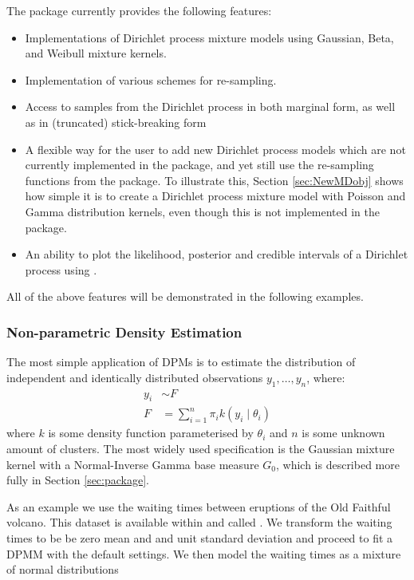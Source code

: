 \documentclass[nojss]{jss}
\begin{document}
The  package currently provides the following features:

\begin{itemize}
\item Implementations of Dirichlet process mixture models using Gaussian, Beta, and Weibull mixture kernels.
\item Implementation of various schemes for re-sampling.
\item Access to samples from the Dirichlet process in both marginal form, as well as in (truncated) stick-breaking form
\item A flexible way for the user to add new Dirichlet process models which are not currently implemented in the package, and yet still use the re-sampling functions from the package. To illustrate this, Section \ref{sec:NewMDobj} shows how simple it is to create a Dirichlet process mixture model with Poisson and Gamma distribution kernels, even though this is not implemented in the package.
\item An ability to plot the likelihood, posterior and credible intervals of a Dirichlet process using .
\end{itemize}

All of the above features will be demonstrated in the following examples.

\subsubsection{Non-parametric Density Estimation}
The most simple application of DPMs is to estimate the distribution of independent and identically distributed observations $y_1,\ldots,y_n$, where:
\begin{align*}
y_i & \sim F \\
F & = \sum _{i=1} ^n \pi _i k(y_i \mid \theta _i)
\end{align*}
where $k$ is some density function parameterised by $\theta _i$ and $n$ is some unknown amount of clusters. The most widely used specification is the Gaussian mixture kernel with a Normal-Inverse Gamma base measure $G_0$, which is described more fully in Section \ref{sec:package}.

As an example we use the waiting times between eruptions of the Old Faithful volcano. This dataset is available within  and called . We transform the waiting times to be be zero mean and and unit standard deviation and proceed to fit a DPMM with the default settings. We then model the waiting times as a mixture of normal distributions
\end{document}
